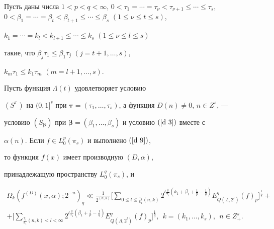 \begin{thm} 


Пусть даны числа $1<p< q<\infty$, $0<\tau_1=\dotsb=\tau_{\nu}<


\tau_{\nu+1}\leq\dotsb\leq{\tau_s}$, $0<\beta_1=\dotsb=\beta_t


<\beta_{t+1}\leq\dotsb\leq\beta_s$ $(1 \leq \nu\leq t \leq s)$, 


$k_1=\dotsb=k_l< k_{l+1}\leq\dotsb\leq k_s$ $(1 \leq \nu\leq l\leq s)$ 


такие, что $\beta_j \tau_1\leq \beta_1 \tau_j$ $(j=t+1,\dotsc,s)$, 


$k_m \tau_1\leq k_1 \tau_m$ $(m=l+1,\dotsc,s)$.


Пусть функция $\Lambda(t)$ удовлетворяет условию 


$(S^{\boldsymbol{\tau}})$ на $(0,1]^s$ при ${\boldsymbol{\tau}}


=(\tau_1,\dotsc,\tau_s)$, а функция $D(n)\neq 0$, $n\in Z^s$, --- 


условию $(S_{\boldsymbol{\beta}})$ при ${\boldsymbol{\beta}}


=(\beta_1,\dotsc,\beta_s)$ и условию $(\ref {d 3})$ вместе с


$\alpha(n)$. Если $f\in L_0^p(\pi_s)$ и выполнено $(\ref {d 9})$, 


то функция $f(x)$ имеет производную $(D,\alpha)$, 


принадлежащую пространству $L_0^q(\pi_s)$, и 


\begin{multline*}


\Omega_{k}(f^{(D)}(x,\alpha);2^{-n})_q \ll


\frac{1}{2^{(n, k)}} \bigg[\sum_{0\leq l\leq{{\frac{\tau_1}


{k_1}}(n, k)}} 2^{l{\frac{q}{\tau_1}} (k_1+\beta_1+{\frac{1}{p}}


-{\frac{1}{q}} )}


E_{Q(\Lambda,2^l)} ^{q} (f)_{p} \bigg] ^{\frac{1}{q}}+ \\


%


+ \bigg[\sum_{{\frac{\tau_1}{k_1}} (n, k)<l < {\infty}} 


2^{l{\frac{q}{\tau_1}} (\beta_1+{\frac{1}{p}}-{\frac{1}{q}})}


E_{Q(\Lambda,2^l)}^q(f)_p \bigg]^{\frac{1}{q}}, 


\ \ k=(k_1,\dotsc,k_s),\ \ n\in Z^s_+.


\end{multline*}


\end{thm} 





